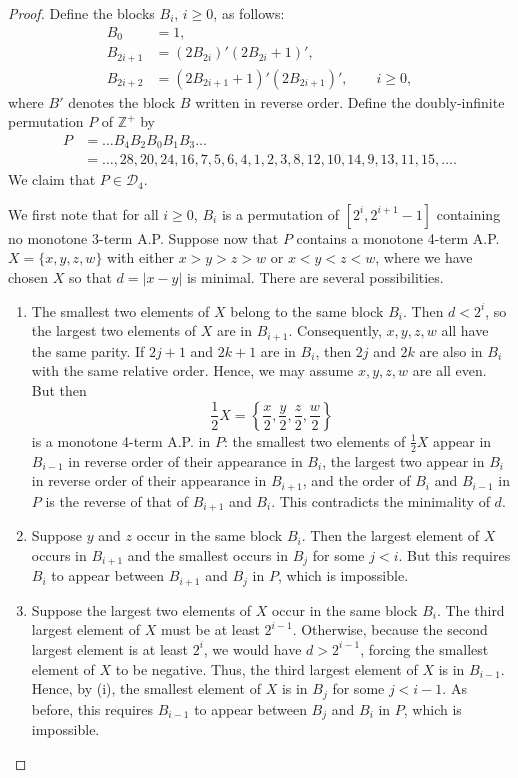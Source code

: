 \documentclass[10pt]{article}
\newcommand{\Zpos}{\mathbb{Z}^{+}}
\newcommand{\Dcal}{\mathscr{D}}
\begin{document}
\begin{proof}
Define the blocks $B_i$, $i\ge0$, as follows:
\[
 \begin{aligned}
 B_0&=1,\\
 B_{2i+1}&=(2B_{2i})'(2B_{2i}+1)',\\
 B_{2i+2}&=(2B_{2i+1}+1)'(2B_{2i+1})',\qquad i\ge0,
 \end{aligned}
\]
where $B'$ denotes the block $B$ written in reverse order. Define the
doubly-infinite permutation $P$ of $\Zpos$ by
\[
 \begin{aligned}
 P&=\ldots B_4B_2B_0B_1B_3\ldots\\
  &=\ldots,28,20,24,16,7,5,6,4,1,2,3,8,12,10,14,9,13,11,15,\ldots.
 \end{aligned}
\]
We claim that $P\in\Dcal_4$.

We first note that for all $i\ge0$, $B_i$ is a permutation of
$[2^i,2^{i+1}-1]$ containing no monotone 3-term A.P. Suppose now that $P$
contains a monotone 4-term A.P. $X=\{x,y,z,w\}$ with either
$x>y>z>w$ or $x<y<z<w$, where we have chosen $X$ so that
$d=|x-y|$ is minimal. There are several possibilities.

\begin{enumerate}[label=(\roman*),leftmargin=2.3em]
\item The smallest two elements of $X$ belong to the same block $B_i$.
Then $d<2^i$, so the largest two elements of $X$ are in $B_{i+1}$.
Consequently, $x,y,z,w$ all have the same parity. If $2j+1$ and $2k+1$
are in $B_i$, then $2j$ and $2k$ are also in $B_i$ with the same relative
order. Hence, we may assume $x,y,z,w$ are all even. But then
\[
 \frac12X=\left\{\frac{x}{2},\frac{y}{2},\frac{z}{2},\frac{w}{2}\right\}
\]
is a monotone 4-term A.P. in $P$: the smallest two elements of
$\tfrac12X$ appear in $B_{i-1}$ in reverse order of their appearance in
$B_i$, the largest two appear in $B_i$ in reverse order of their
appearance in $B_{i+1}$, and the order of $B_i$ and $B_{i-1}$ in $P$ is
the reverse of that of $B_{i+1}$ and $B_i$. This contradicts the
minimality of $d$.

\item Suppose $y$ and $z$ occur in the same block $B_i$. Then the largest
element of $X$ occurs in $B_{i+1}$ and the smallest occurs in $B_j$ for
some $j<i$. But this requires $B_i$ to appear between $B_{i+1}$ and $B_j$
in $P$, which is impossible.

\item Suppose the largest two elements of $X$ occur in the same block
$B_i$. The third largest element of $X$ must be at least $2^{i-1}$.
Otherwise, because the second largest element is at least $2^i$, we would
have $d>2^{i-1}$, forcing the smallest element of $X$ to be negative.
Thus, the third largest element of $X$ is in $B_{i-1}$. Hence, by (i), the
smallest element of $X$ is in $B_j$ for some $j<i-1$. As before, this
requires $B_{i-1}$ to appear between $B_j$ and $B_i$ in $P$, which is
impossible.


\end{enumerate}
\end{proof}
\end{document}
